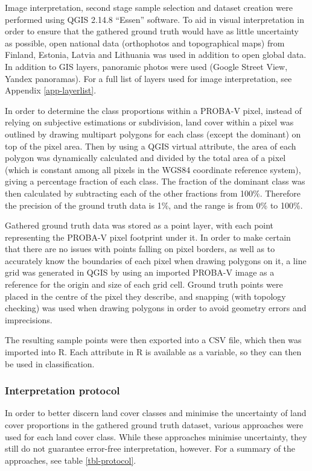 \documentclass[a4paper,12pt]{scrbook}
\begin{document}
Image interpretation, second stage sample selection and dataset creation were performed using QGIS 2.14.8 ``Essen'' software. To aid in visual interpretation in order to ensure that the gathered ground truth would have as little uncertainty as possible, open national data (orthophotos and topographical maps) from Finland, Estonia, Latvia and Lithuania was used in addition to open global data. In addition to GIS layers, panoramic photos were used (Google Street View, Yandex panoramas). For a full list of layers used for image interpretation, see Appendix \ref{app-layerlist}.

In order to determine the class proportions within a PROBA-V pixel, instead of relying on subjective estimations or subdivision, land cover within a pixel was outlined by drawing multipart polygons for each class (except the dominant) on top of the pixel area. Then by using a QGIS virtual attribute, the area of each polygon was dynamically calculated and divided by the total area of a pixel (which is constant among all pixels in the WGS84 coordinate reference system), giving a percentage fraction of each class. The fraction of the dominant class was then calculated by subtracting each of the other fractions from 100\%. Therefore the precision of the ground truth data is 1\%, and the range is from 0\% to 100\%.

Gathered ground truth data was stored as a point layer, with each point representing the PROBA-V pixel footprint under it. In order to make certain that there are no issues with points falling on pixel borders, as well as to accurately know the boundaries of each pixel when drawing polygons on it, a line grid was generated in QGIS by using an imported PROBA-V image as a reference for the origin and size of each grid cell. Ground truth points were placed in the centre of the pixel they describe, and snapping (with topology checking) was used when drawing polygons in order to avoid geometry errors and imprecisions.

The resulting sample points were then exported into a CSV file, which then was imported into R. Each attribute in R is available as a variable, so they can then be used in classification.

\subsubsection{Interpretation protocol}

In order to better discern land cover classes and minimise the uncertainty of land cover proportions in the gathered ground truth dataset, various approaches were used for each land cover class. While these approaches minimise uncertainty, they still do not guarantee error-free interpretation, however. For a summary of the approaches, see table \ref{tbl-protocol}.
\end{document}
